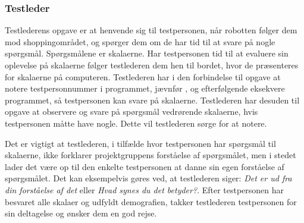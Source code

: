 \subsubsection*{Testleder}
%
Testlederens opgave er at henvende sig til testpersonen, når robotten følger dem mod shoppingområdet, og spørger dem om de har tid til at svare på nogle spørgsmål. Spørgsmålene er skalaerne. Har testpersonen tid til at evaluere sin oplevelse på skalaerne følger testlederen dem hen til bordet, hvor de præsenteres for skalaerne på computeren. Testlederen har i den forbindelse til opgave at notere testpersonnummer i programmet, jævnfør , og efterfølgende eksekvere programmet, så testpersonen kan svare på skalaerne. Testlederen har desuden til opgave at observere og svare på spørgsmål vedrørende skalaerne, hvis testpersonen måtte have nogle. Dette vil testlederen sørge for at notere. 

Det er vigtigt at testlederen, i tilfælde hvor testpersonen har spørgsmål til skalaerne, ikke forklarer projektgruppens forståelse af spørgsmålet, men i stedet lader det være op til den enkelte testpersonen at danne sin egen forståelse af spørgsmålet. Det kan eksempelvis gøres ved, at testlederen siger: \textit{Det er ud fra din forståelse af det} eller \textit{Hvad synes du det betyder?}. Efter testpersonen har besvaret alle skalaer og udfyldt demografien, takker testlederen testpersonen for sin deltagelse og ønsker dem en god rejse.
\newpage
 
